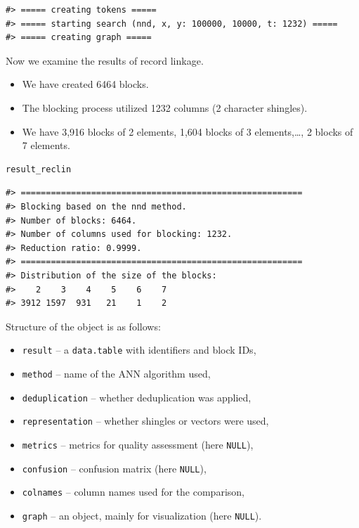 \begin{verbatim}
#> ===== creating tokens =====
#> ===== starting search (nnd, x, y: 100000, 10000, t: 1232) =====
#> ===== creating graph =====
\end{verbatim}

Now we examine the results of record linkage.

\begin{itemize}
\tightlist
\item
  We have created 6464 blocks.
\item
  The blocking process utilized 1232 columns (2 character shingles).
\item
  We have 3,916 blocks of 2 elements, 1,604 blocks of 3 elements,\ldots, 2 blocks of 7 elements.
\end{itemize}

\begin{verbatim}
result_reclin
\end{verbatim}

\begin{verbatim}
#> ========================================================
#> Blocking based on the nnd method.
#> Number of blocks: 6464.
#> Number of columns used for blocking: 1232.
#> Reduction ratio: 0.9999.
#> ========================================================
#> Distribution of the size of the blocks:
#>    2    3    4    5    6    7 
#> 3912 1597  931   21    1    2
\end{verbatim}

Structure of the object is as follows:

\begin{itemize}
\tightlist
\item
  \texttt{result} -- a \texttt{data.table} with identifiers and block IDs,
\item
  \texttt{method} -- name of the ANN algorithm used,
\item
  \texttt{deduplication} -- whether deduplication was applied,
\item
  \texttt{representation} -- whether shingles or vectors were used,
\item
  \texttt{metrics} -- metrics for quality assessment (here \texttt{NULL}),
\item
  \texttt{confusion} -- confusion matrix (here \texttt{NULL}),
\item
  \texttt{colnames} -- column names used for the comparison,
\item
  \texttt{graph} -- an  object, mainly for visualization (here \texttt{NULL}).
\end{itemize}

